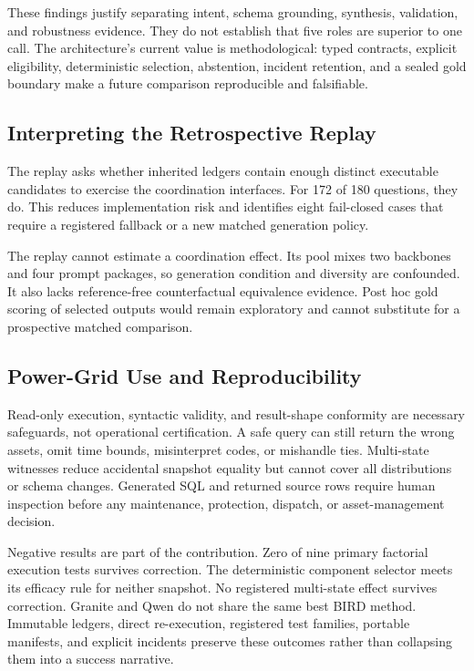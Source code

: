 \documentclass[applsci,article,submit,moreauthors]{Definitions/mdpi}
\begin{document}
These findings justify separating intent, schema grounding, synthesis, validation, and robustness evidence. They do not establish that five roles are superior to one call. The architecture's current value is methodological: typed contracts, explicit eligibility, deterministic selection, abstention, incident retention, and a sealed gold boundary make a future comparison reproducible and falsifiable.

\subsection{Interpreting the Retrospective Replay}

The replay asks whether inherited ledgers contain enough distinct executable candidates to exercise the coordination interfaces. For 172 of 180 questions, they do. This reduces implementation risk and identifies eight fail-closed cases that require a registered fallback or a new matched generation policy.

The replay cannot estimate a coordination effect. Its pool mixes two backbones and four prompt packages, so generation condition and diversity are confounded. It also lacks reference-free counterfactual equivalence evidence. Post hoc gold scoring of selected outputs would remain exploratory and cannot substitute for a prospective matched comparison.

\subsection{Power-Grid Use and Reproducibility}

Read-only execution, syntactic validity, and result-shape conformity are necessary safeguards, not operational certification. A safe query can still return the wrong assets, omit time bounds, misinterpret codes, or mishandle ties. Multi-state witnesses reduce accidental snapshot equality but cannot cover all distributions or schema changes. Generated SQL and returned source rows require human inspection before any maintenance, protection, dispatch, or asset-management decision.

Negative results are part of the contribution. Zero of nine primary factorial execution tests survives correction. The deterministic component selector meets its efficacy rule for neither snapshot. No registered multi-state effect survives correction. Granite and Qwen do not share the same best BIRD method. Immutable ledgers, direct re-execution, registered test families, portable manifests, and explicit incidents preserve these outcomes rather than collapsing them into a success narrative.
\end{document}
